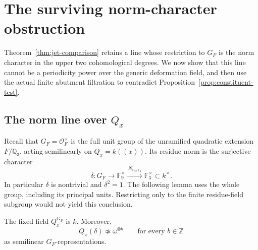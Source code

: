 \section{The surviving norm-character obstruction}\label{sec:obstruction}

Theorem~\ref{thm:jet-comparison} retains a line whose restriction to \(G_F\)
is the norm character in the upper two cohomological degrees. We now show
that this line cannot be a periodicity
power over the generic deformation field, and then use the actual finite
abutment filtration to contradict Proposition~\ref{prop:constituent-test}.

\subsection{The norm line over \texorpdfstring{\(Q_x\)}{Qx}}

Recall that \(G_F=\mathcal O_F^\times\) is the full unit group of the
unramified quadratic extension \(F/\mathbb Q_3\), acting semilinearly on
\(Q_x=k((x))\). Its residue norm is the surjective character
\[
 \delta:G_F\longrightarrow\mathbb F_9^\times
   \xrightarrow{\,N_{\mathbb F_9/\mathbb F_3}\,}\mathbb F_3^\times
   \subset k^\times.
\]
In particular \(\delta\) is nontrivial and \(\delta^2=1\). The following
lemma uses the whole group, including its principal units. Restricting only
to the finite residue-field subgroup would not yield this conclusion.

\begin{lemma}
\label{lem:generic-character}
The fixed field \(Q_x^{G_F}\) is \(k\). Moreover,
\[
 Q_x(\delta)\not\simeq\overline\omega^{\otimes b}
             \qquad\text{for every }b\in\mathbb Z
\]
as semilinear \(G_F\)-representations.
\end{lemma}

